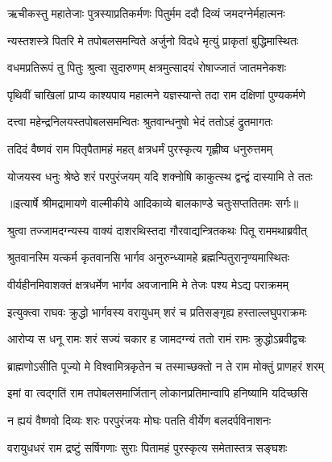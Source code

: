 \twolineshloka
{ऋचीकस्तु महातेजाः पुत्रस्याप्रतिकर्मणः}
{पितुर्मम ददौ दिव्यं जमदग्नेर्महात्मनः} %

\twolineshloka
{न्यस्तशस्त्रे पितरि मे तपोबलसमन्विते}
{अर्जुनो विदधे मृत्युं प्राकृतां बुद्धिमास्थितः} %

\twolineshloka
{वधमप्रतिरूपं तु पितुः श्रुत्वा सुदारुणम्}
{क्षत्रमुत्सादयं रोषाज्जातं जातमनेकशः} %

\twolineshloka
{पृथिवीं चाखिलां प्राप्य काश्यपाय महात्मने}
{यज्ञस्यान्ते तदा राम दक्षिणां पुण्यकर्मणे} %

\twolineshloka
{दत्त्वा महेन्द्रनिलयस्तपोबलसमन्वितः}
{श्रुतवान्धनुषो भेदं ततोऽहं द्रुतमागतः} %

\twolineshloka
{तदिदं वैष्णवं राम पितृपैतामहं महत्}
{क्षत्रधर्मं पुरस्कृत्य गृह्णीष्व धनुरुत्तमम्} %

\twolineshloka
{योजयस्व धनुः श्रेष्ठे शरं परपुरंजयम्}
{यदि शक्नोषि काकुत्स्थ द्वन्द्वं दास्यामि ते ततः} %


{॥इत्यार्षे श्रीमद्रामायणे वाल्मीकीये आदिकाव्ये बालकाण्डे चतुःसप्ततितमः सर्गः॥}


\twolineshloka
{श्रुत्वा तज्जामदग्न्यस्य वाक्यं दाशरथिस्तदा}
{गौरवाद्यन्त्रितकथः पितू राममथाब्रवीत्} %

\twolineshloka
{श्रुतवानस्मि यत्कर्म कृतवानसि भार्गव}
{अनुरुन्ध्यामहे ब्रह्मन्पितुरानृण्यमास्थितः} %

\twolineshloka
{वीर्यहीनमिवाशक्तं क्षत्रधर्मेण भार्गव}
{अवजानामि मे तेजः पश्य मेऽद्य पराक्रमम्} %

\twolineshloka
{इत्युक्त्वा राघवः क्रुद्धो भार्गवस्य वरायुधम्}
{शरं च प्रतिसङ्गृह्य हस्ताल्लघुपराक्रमः} %

\twolineshloka
{आरोप्य स धनू रामः शरं सज्यं चकार ह}
{जामदग्न्यं ततो रामं रामः क्रुद्धोऽब्रवीद्वचः} %

\twolineshloka
{ब्राह्मणोऽसीति पूज्यो मे विश्वामित्रकृतेन च}
{तस्माच्छक्तो न ते राम मोक्तुं प्राणहरं शरम्} %

\twolineshloka
{इमां वा त्वद्गतिं राम तपोबलसमार्जितान्}
{लोकानप्रतिमान्वापि हनिष्यामि यदिच्छसि} %

\twolineshloka
{न ह्ययं वैष्णवो दिव्यः शरः परपुरंजयः}
{मोघः पतति वीर्येण बलदर्पविनाशनः} %

\twolineshloka
{वरायुधधरं राम द्रष्टुं सर्षिगणाः सुराः}
{पितामहं पुरस्कृत्य समेतास्तत्र सङ्घशः} %

